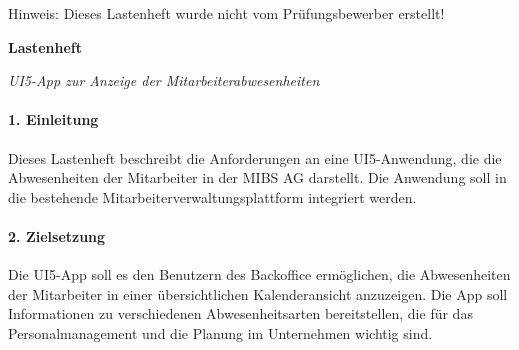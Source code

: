 \LARGE
Hinweis: Dieses Lastenheft wurde nicht vom Prüfungsbewerber erstellt!

\textbf{Lastenheft}

\normalsize
\textit{UI5-App zur Anzeige der Mitarbeiterabwesenheiten} 

\paragraph{1. Einleitung}
Dieses Lastenheft beschreibt die Anforderungen an eine UI5-Anwendung, die die Abwesenheiten der Mitarbeiter in der MIBS AG darstellt. Die Anwendung soll in die bestehende Mitarbeiterverwaltungsplattform integriert werden. 
\paragraph{2. Zielsetzung}
Die UI5-App soll es den Benutzern des Backoffice ermöglichen, die Abwesenheiten der Mitarbeiter in einer übersichtlichen Kalenderansicht anzuzeigen. Die App soll Informationen zu verschiedenen Abwesenheitsarten bereitstellen, die für das Personalmanagement und die Planung im Unternehmen wichtig sind.
